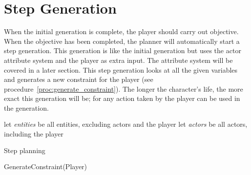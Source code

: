 \section{Step Generation}
When the initial generation is complete, the player should carry out \his objective.
When the objective has been completed, the planner will automatically start a step generation.
This generation is like the initial generation but uses the actor attribute system and the player as extra input.
The attribute system will be covered in a later section.
This step generation looks at all the given variables and generates a new constraint for the player (see procedure~\ref{proc:generate_constraint}).
The longer the character's life, the more exact this generation will be; for any action taken by the player can be used in the generation.
\begin{algorithm}
	let \textit{entities} be all entities, excluding actors and the player\;
	let \textit{actors} be all actors, including the player\;
	\caption{Step planning}\label{alg:step_planning}
\end{algorithm}
\begin{procedure}
	\caption{GenerateConstraint(Player)}\label{proc:generate_constraint}
\end{procedure}
